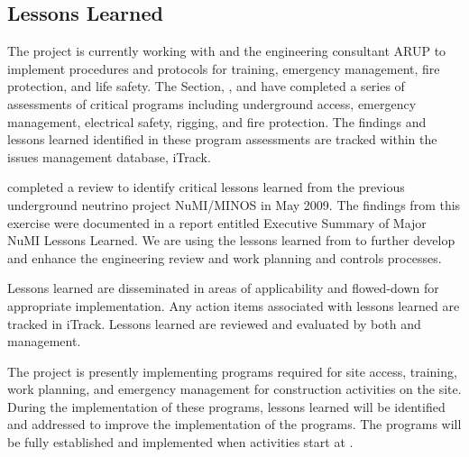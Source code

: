 \subsection{Lessons Learned}

The  project is currently working with  and the 
engineering consultant ARUP to implement  procedures and
protocols for training, emergency management, fire
protection, and life safety. The \fnal {} Section, , and
  have completed a series of assessments of
critical   programs including underground access,
emergency management, electrical safety, rigging, and fire
protection. The findings and lessons learned identified in these
 program assessments are tracked within the \fnal issues management
database, iTrack.

 completed a review to
identify critical lessons learned from the previous underground
neutrino project NuMI/MINOS  in May 2009. The findings from this
exercise were documented in a report entitled Executive Summary of
Major NuMI Lessons Learned.  We are using the  lessons learned from
to further develop and enhance
the  engineering review and work planning and controls
processes.

Lessons learned are disseminated in areas of applicability and
flowed-down for appropriate implementation. Any action items
associated with lessons learned are tracked in iTrack. Lessons learned
are reviewed and evaluated by both  and  management.

The  project is presently implementing 
programs required for site access, training, work planning, and
emergency management for construction activities on the 
site. During the implementation of these programs,  lessons learned will
be identified and addressed to improve the implementation of the 
 programs.  The  programs will be fully
established and implemented when  activities start at
.
